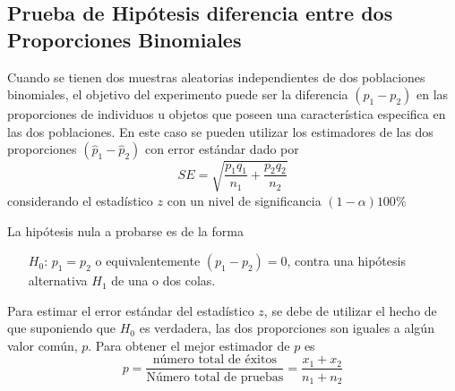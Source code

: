 \subsection*{Prueba de Hip\'otesis diferencia entre dos Proporciones Binomiales}

Cuando se tienen dos muestras aleatorias independientes de dos poblaciones binomiales, el objetivo del experimento puede ser la diferencia $\left(p_{1}-p_{2}\right)$ en las proporciones de individuos u objetos que poseen una caracter\'istica especifica en las dos poblaciones. En este caso se pueden utilizar los estimadores de las dos proporciones $\left(\hat{p}_{1}-\hat{p}_{2}\right)$ con error est\'andar dado por
$$SE=\sqrt{\frac{p_{1}q_{1}}{n_{1}}+\frac{p_{2}q_{2}}{n_{2}}}$$
considerando el estad\'istico $z$ con un nivel de significancia $\left(1-\alpha\right)100\%$

La hip\'otesis nula a probarse es de la forma
\begin{itemize}
\item[$H_{0}$: ] $p_{1}=p_{2}$ o equivalentemente $\left(p_{1}-p_{2}\right)=0$, contra una hip\'otesis alternativa $H_{1}$ de una o dos colas.
\end{itemize}

Para estimar el error est\'andar del estad\'istico $z$, se debe de utilizar el hecho de que suponiendo que $H_{0}$ es verdadera, las dos proporciones son iguales a alg\'un valor com\'un, $p$. Para obtener el mejor estimador de $p$ es
$$p=\frac{\textrm{n\'umero total de \'exitos}}{\textrm{N\'umero total de pruebas}}=\frac{x_{1}+x_{2}}{n_{1}+n_{2}}$$

